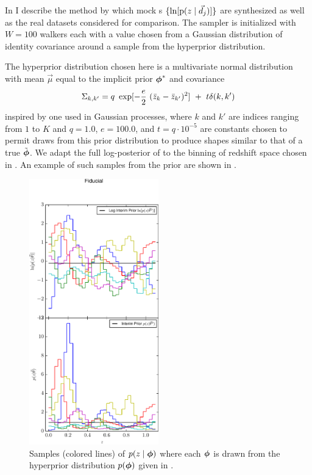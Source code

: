 In  I describe the method by which mock \pzpdf s $\{\ln[\mathrm{p}(z \mid \vec{d}_{j})]\}$ are synthesized as well as the real datasets considered for comparison.  
The sampler is initialized with $W=100$ walkers each with a value chosen from a Gaussian distribution of identity covariance around a sample from the hyperprior distribution.  

The hyperprior distribution chosen here is a multivariate normal distribution with mean $\vec{\mu}$ equal to the implicit prior ${\boldsymbol{\phi}}^{*}$ and covariance
\begin{equation}
\eqlabel{eqn:priorcov}
\Sigma_{k,k'} = q\ \exp[-\frac{e}{2}\ (\bar{z}_{k}-\bar{z}_{k'})^{2}]\ +\ t\delta(k,k')
\end{equation}
inspired by one used in Gaussian processes, where $k$ and $k'$ are indices ranging from $1$ to $K$ and $q=1.0$, $e=100.0$, and $t=q\cdot10^{-5}$ are constants chosen to permit draws from this prior distribution to produce shapes similar to that of a true $\tilde{{\boldsymbol{\phi}}}$.  
We adapt the full log-posterior of  to the binning of redshift space chosen in .
An example of such samples from the prior are shown in .

\begin{figure}
	\includegraphics[width=0.5\textwidth]{figures/chippr/null_priorsamps.pdf}
	\caption{Samples (colored lines) of $p(z \mid {\ensuremath{\boldsymbol{\phi}}})$ where each ${\boldsymbol{\phi}}$ is drawn from the hyperprior distribution $p({\boldsymbol{\phi}})$ given in .}
	\label{fig:prior}
\end{figure}


